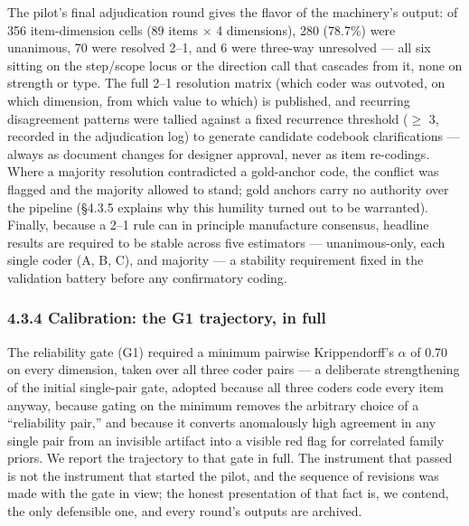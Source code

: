 The pilot's final adjudication round gives the flavor of the machinery's output: of 356 item-dimension cells (89 items $\times$ 4 dimensions), 280 (78.7\%) were unanimous, 70 were resolved 2--1, and 6 were three-way unresolved --- all six sitting on the step/scope locus or the direction call that cascades from it, none on strength or type. The full 2--1 resolution matrix (which coder was outvoted, on which dimension, from which value to which) is published, and recurring disagreement patterns were tallied against a fixed recurrence threshold ($\ge$ 3, recorded in the adjudication log) to generate candidate codebook clarifications --- always as document changes for designer approval, never as item re-codings. Where a majority resolution contradicted a gold-anchor code, the conflict was flagged and the majority allowed to stand; gold anchors carry no authority over the pipeline (\S{}4.3.5 explains why this humility turned out to be warranted). Finally, because a 2--1 rule can in principle manufacture consensus, headline results are required to be stable across five estimators --- unanimous-only, each single coder (A, B, C), and majority --- a stability requirement fixed in the validation battery before any confirmatory coding.

\subsubsection{4.3.4 Calibration: the G1 trajectory, in full}\label{calibration-the-g1-trajectory-in-full}

The reliability gate (G1) required a minimum pairwise Krippendorff's $\alpha$ of 0.70 on every dimension, taken over all three coder pairs --- a deliberate strengthening of the initial single-pair gate, adopted because all three coders code every item anyway, because gating on the minimum removes the arbitrary choice of a ``reliability pair,'' and because it converts anomalously high agreement in any single pair from an invisible artifact into a visible red flag for correlated family priors. We report the trajectory to that gate in full. The instrument that passed is not the instrument that started the pilot, and the sequence of revisions was made with the gate in view; the honest presentation of that fact is, we contend, the only defensible one, and every round's outputs are archived.

